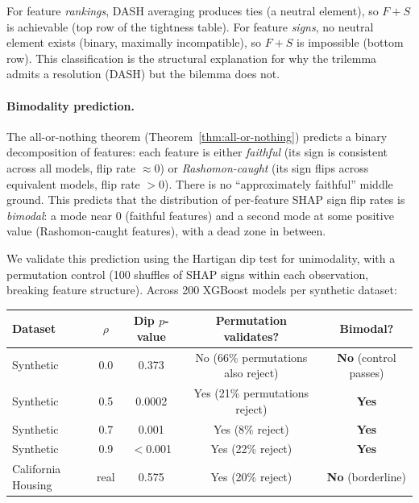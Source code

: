 \documentclass{article}
\begin{document}
For feature \emph{rankings}, DASH averaging produces ties (a neutral element), so $F{+}S$ is achievable (top row of the tightness table).
For feature \emph{signs}, no neutral element exists (binary, maximally incompatible), so $F{+}S$ is impossible (bottom row).
This classification is the structural explanation for why the trilemma admits a resolution (DASH) but the bilemma does not.

\paragraph{Bimodality prediction.}
The all-or-nothing theorem (Theorem~\ref{thm:all-or-nothing}) predicts a binary decomposition of features: each feature is either \emph{faithful} (its sign is consistent across all models, flip rate $\approx 0$) or \emph{Rashomon-caught} (its sign flips across equivalent models, flip rate $> 0$).
There is no ``approximately faithful'' middle ground.
This predicts that the distribution of per-feature SHAP sign flip rates is \emph{bimodal}: a mode near $0$ (faithful features) and a second mode at some positive value (Rashomon-caught features), with a dead zone in between.

We validate this prediction using the Hartigan dip test for unimodality, with a permutation control (100 shuffles of SHAP signs within each observation, breaking feature structure).
Across 200 XGBoost models per synthetic dataset:

\begin{center}
\small
\begin{tabular}{@{}lcccc@{}}
\toprule
Dataset & $\rho$ & Dip $p$-value & Permutation validates? & Bimodal? \\
\midrule
Synthetic & 0.0 & 0.373 & No (66\% permutations also reject) & \textbf{No} (control passes) \\
Synthetic & 0.5 & 0.0002 & Yes (21\% permutations reject) & \textbf{Yes} \\
Synthetic & 0.7 & 0.001 & Yes (8\% reject) & \textbf{Yes} \\
Synthetic & 0.9 & $<$0.001 & Yes (22\% reject) & \textbf{Yes} \\
California Housing & real & 0.575 & Yes (20\% reject) & \textbf{No} (borderline) \\
\bottomrule
\end{tabular}
\end{center}
\end{document}
